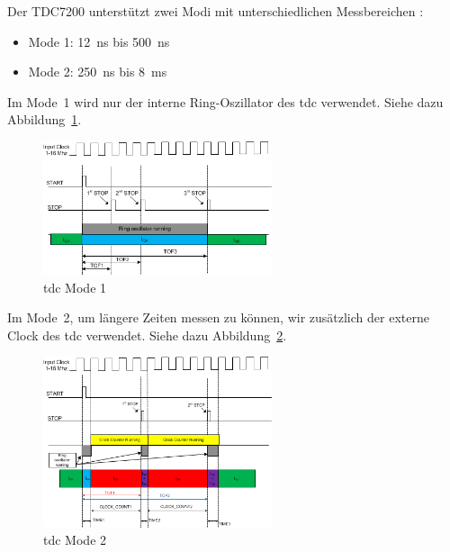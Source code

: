 
Der TDC7200 unterstützt zwei Modi mit unterschiedlichen Messbereichen \cite{ti2016tdc7200_datasheet}:

\begin{itemize}
    \item Mode 1: 12~ns bis 500~ns
    \item Mode 2: 250~ns bis 8~ms
\end{itemize}

Im Mode~1 wird nur der interne Ring-Oszillator des \acrshort{tdc} verwendet. Siehe dazu Abbildung~\ref{fig:tdc_mode1}.

\begin{figure}[H]
    \centering
    \includegraphics[width=0.6\textwidth]{graphics/tdc_mode1.png}
    \caption[\acrshort{tdc} Mode 1]{\acrshort{tdc} Mode 1 \cite{ti2016tdc7200_datasheet}}\label{fig:tdc_mode1}
\end{figure}

Im Mode~2, um längere Zeiten messen zu können, wir zusätzlich der externe Clock des \acrshort{tdc} verwendet. Siehe dazu
Abbildung~\ref{fig:tdc_mode2}.

\begin{figure}[H]
    \centering
    \includegraphics[width=0.6\textwidth]{graphics/tdc_mode2.png}
    \caption[\acrshort{tdc} Mode 2]{\acrshort{tdc} Mode 2 \cite{ti2016tdc7200_datasheet}}\label{fig:tdc_mode2}
\end{figure}

